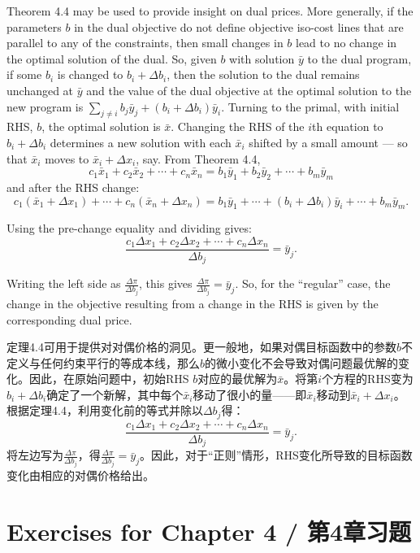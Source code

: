 \begin{original}
Theorem 4.4 may be used to provide insight on dual prices. More generally, if the parameters $b$ in the dual objective do not define objective iso-cost lines that are parallel to any of the constraints, then small changes in $b$ lead to no change in the optimal solution of the dual. So, given $b$ with solution $\bar{y}$ to the dual program, if some $b_i$ is changed to $b_i + \Delta b_i$, then the solution to the dual remains unchanged at $\bar{y}$ and the value of the dual objective at the optimal solution to the new program is $\sum_{j \neq i} b_j \bar{y}_j + (b_i + \Delta b_i)\bar{y}_i$. Turning to the primal, with initial RHS, $b$, the optimal solution is $\bar{x}$. Changing the RHS of the $i$th equation to $b_i + \Delta b_i$ determines a new solution with each $\bar{x}_i$ shifted by a small amount --- so that $\bar{x}_i$ moves to $\bar{x}_i + \Delta x_i$, say. From Theorem 4.4,
\[
c_1 \bar{x}_1 + c_2 \bar{x}_2 + \cdots + c_n \bar{x}_n = b_1 \bar{y}_1 + b_2 \bar{y}_2 + \cdots + b_m \bar{y}_m
\]
and after the RHS change:
\[
c_1(\bar{x}_1 + \Delta x_1) + \cdots + c_n(\bar{x}_n + \Delta x_n) = b_1 \bar{y}_1 + \cdots + (b_i + \Delta b_i)\bar{y}_i + \cdots + b_m \bar{y}_m.
\]

Using the pre-change equality and dividing gives:
\[
\frac{c_1 \Delta x_1 + c_2 \Delta x_2 + \cdots + c_n \Delta x_n}{\Delta b_j} = \bar{y}_j.
\]

Writing the left side as $\frac{\Delta \pi}{\Delta b_j}$, this gives $\frac{\Delta \pi}{\Delta b_j} = \bar{y}_j$. So, for the ``regular'' case, the change in the objective resulting from a change in the RHS is given by the corresponding dual price.
\end{original}
\begin{translation}
定理4.4可用于提供对对偶价格的洞见。更一般地，如果对偶目标函数中的参数$b$不定义与任何约束平行的等成本线，那么$b$的微小变化不会导致对偶问题最优解的变化。因此，在原始问题中，初始RHS $b$对应的最优解为$\bar{x}$。将第$i$个方程的RHS变为$b_i + \Delta b_i$确定了一个新解，其中每个$\bar{x}_i$移动了很小的量——即$\bar{x}_i$移动到$\bar{x}_i + \Delta x_i$。根据定理4.4，利用变化前的等式并除以$\Delta b_j$得：
\[
\frac{c_1 \Delta x_1 + c_2 \Delta x_2 + \cdots + c_n \Delta x_n}{\Delta b_j} = \bar{y}_j.
\]
将左边写为$\frac{\Delta \pi}{\Delta b_j}$，得$\frac{\Delta \pi}{\Delta b_j} = \bar{y}_j$。因此，对于``正则''情形，RHS变化所导致的目标函数变化由相应的对偶价格给出。
\end{translation}

\section{Exercises for Chapter 4 / 第4章习题}

